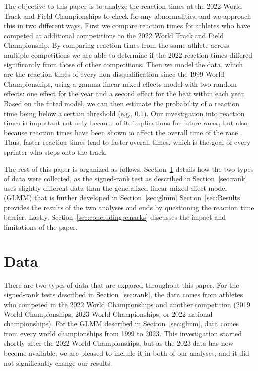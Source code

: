 \documentclass[12pt, letterpaper, titlepage]{article}
\newcommand{\eds}[1]{\textcolor{red}{EDS: (#1)}}
\newcommand{\of}[1]{\textcolor{violet}{OF: #1}}
\begin{document}
The objective to this paper is to analyze the reaction times at the 2022 World 
Track and Field Championships to check for any abnormalities, and we approach
this in two different ways.  First we compare reaction times for athletes who 
have competed at additional competitions to the 2022 World Track and Field 
Championship.  By comparing reaction times from the same athlete across multiple
competitions we are able to determine if the 2022 reaction times differed 
significantly from those of other competitions.  Then we model the data, which are
the reaction times of every non-disqualification since the 1999 World 
Championships, using a gamma linear mixed-effects model with two random effects: 
one effect for the year and a second effect for the heat within each year.
Based on the fitted model, we can then estimate the probability of a reaction 
time being below a certain threshold (e.g., 0.1). 
Our investigation into reaction times is important not only because of its
implications for future races, but also because reaction times have
been shown to affect the overall time of the race \citep{delalija2008reaction}.
Thus, faster reaction times lead to faster overall times, which is the goal of
every sprinter who steps onto the track.


The rest of this paper is organized as follows. Section~\ref{sec:Data} details 
how the two types of data were collected, as the signed-rank test as described
in Section~\ref{sec:rank} uses slightly different data than the generalized 
linear mixed-effect model (GLMM) that is further developed in 
Section~\ref{sec:glmm} Section~\ref{sec:Results} provides the results of the two
analyses and ends by questioning the reaction time barrier.  Lastly, 
Section~\ref{sec:concludingremarks} discusses the impact and limitations of the
paper.


\section{Data} \label{sec:Data}

There are two types of data that are explored throughout this paper.  For the
signed-rank tests described in Section~\ref{sec:rank}, the data comes from 
athletes who competed in the 2022 World Championships and another competition 
(2019 World Championships, 2023 World Championships, or 2022 national 
championships). For the GLMM described in Section~\ref{sec:glmm}, data comes
from every world championships from 1999 to 2023. This investigation started 
shortly after the 2022 World Championships, but as the 2023 data has now become 
available, we are pleased to include it in both of our analyses, and it did not
significantly change our results.
\end{document}
